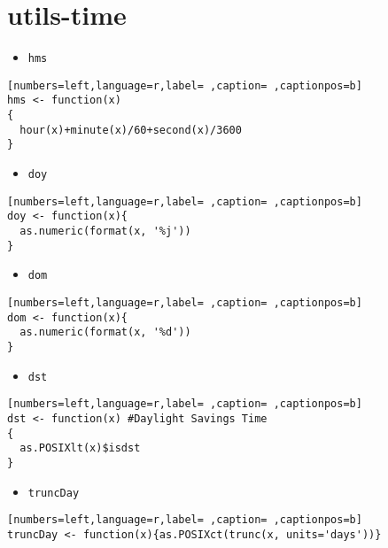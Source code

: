 \section{utils-time}
\label{sec:org16574e9}
\begin{itemize}
\item \texttt{hms}
\end{itemize}
\begin{lstlisting}[numbers=left,language=r,label= ,caption= ,captionpos=b]
hms <- function(x)
{
  hour(x)+minute(x)/60+second(x)/3600
}
\end{lstlisting}
\begin{itemize}
\item \texttt{doy}
\end{itemize}
\begin{lstlisting}[numbers=left,language=r,label= ,caption= ,captionpos=b]
doy <- function(x){
  as.numeric(format(x, '%j'))
}
\end{lstlisting}
\begin{itemize}
\item \texttt{dom}
\end{itemize}
\begin{lstlisting}[numbers=left,language=r,label= ,caption= ,captionpos=b]
dom <- function(x){
  as.numeric(format(x, '%d'))
}
\end{lstlisting}
\begin{itemize}
\item \texttt{dst}
\end{itemize}
\begin{lstlisting}[numbers=left,language=r,label= ,caption= ,captionpos=b]
dst <- function(x) #Daylight Savings Time
{
  as.POSIXlt(x)$isdst
}
\end{lstlisting}
\begin{itemize}
\item \texttt{truncDay}
\end{itemize}
\begin{lstlisting}[numbers=left,language=r,label= ,caption= ,captionpos=b]
truncDay <- function(x){as.POSIXct(trunc(x, units='days'))}
\end{lstlisting}
